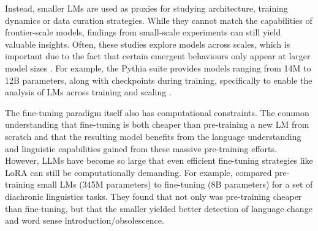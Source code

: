 Instead, smaller LMs are used as proxies for studying architecture, training dynamics or data curation strategies. While they cannot match the capabilities of frontier-scale models, findings from small-scale experiments can still yield valuable insights. Often, these studies explore models across scales, which is important due to the fact that certain emergent behaviours only appear at larger model sizes \citep{wei2022emergent, ganguli2022predictability}. For example, the Pythia suite provides models ranging from 14M to 12B parameters, along with checkpoints during training, specifically to enable the analysis of LMs across training and scaling \citep{biderman2023pythia}.

The fine-tuning paradigm itself also has computational constraints. The common understanding that fine-tuning is both cheaper than pre-training a new LM from scratch and that the resulting model benefits from the language understanding and linguistic capabilities gained from these massive pre-training efforts. However, LLMs have become so large that even efficient fine-tuning strategies like LoRA \citep{hu2022lora} can still be computationally demanding. For example, \citet{fittschen2025pretraininglanguagemodelsdiachronic} compared pre-training small LMs (345M parameters) to fine-tuning  (8B parameters) for a set of diachronic linguistics tasks. They found that not only was pre-training cheaper than fine-tuning, but that the smaller yielded better detection of language change and word sense introduction/obsolescence. 

